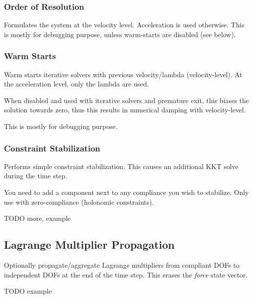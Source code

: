 \subsubsection{Order of Resolution}


Formulates the system at the velocity level. Acceleration is used
otherwise. This is mostly for debugging purpose, unless warm-starts
are disabled (see below).

\subsubsection{Warm Starts}


Warm starts iterative solvers with previous velocity/lambda (velocity-level). At the
acceleration level, only the lambda are used.

When disabled and used with iterative solvers and premature exit, this
biases the solution towards zero, thus this results in numerical
damping with velocity-level.

This is mostly for debugging purpose.

\subsubsection{Constraint Stabilization}


Performs simple constraint stabilization. This causes an additional
KKT solve during the time step.

You need to add a  component next to any
compliance you wish to stabilize. Only use with zero-compliance
(holonomic constraints).

TODO more, example

\subsection{Lagrange Multiplier Propagation}


Optionally propagate/aggregate Lagrange multipliers from compliant
DOFs to independent DOFs at the end of the time step. This erases the
\emph{force} state vector.

TODO example

